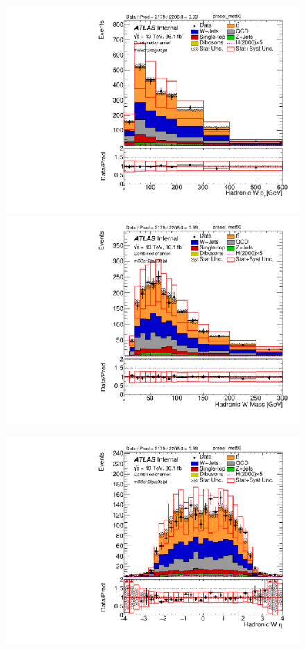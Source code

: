 \begin{figure}[!h]
\begin{center}
\includegraphics[scale=0.33]{./figures/boosted/PlotsInMbbCR/DataMC_2tag_0bjet_mbbcr_lepton_presel_met50_WhadPt}
\includegraphics[scale=0.33]{./figures/boosted/PlotsInMbbCR/DataMC_2tag_0bjet_mbbcr_lepton_presel_met50_WhadMass} \\
\par\medskip
\includegraphics[scale=0.33]{./figures/boosted/PlotsInMbbCR/DataMC_2tag_0bjet_mbbcr_lepton_presel_met50_WhadEta}

\end{center}
\end{figure}
